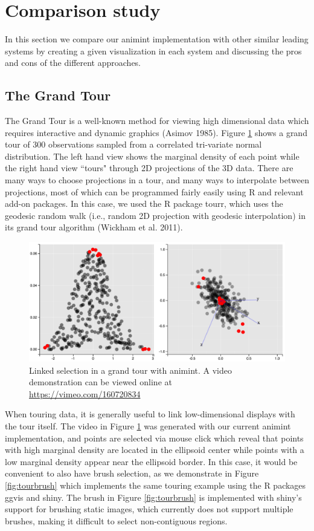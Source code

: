 \documentclass[12pt,]{article}
\theoremstyle{definition}
\theoremstyle{definition}
\theoremstyle{remark}
\begin{document}
\section{Comparison study}\label{compare}

In this section we compare our animint implementation with other similar
leading systems by creating a given visualization in each system and
discussing the pros and cons of the different approaches.

\subsection{The Grand Tour}\label{tour}

The Grand Tour is a well-known method for viewing high dimensional data
which requires interactive and dynamic graphics (Asimov 1985). Figure
\ref{fig:tour} shows a grand tour of 300 observations sampled from a
correlated tri-variate normal distribution. The left hand view shows the
marginal density of each point while the right hand view ``tours"
through 2D projections of the 3D data. There are many ways to choose
projections in a tour, and many ways to interpolate between projections,
most of which can be programmed fairly easily using R and relevant
add-on packages. In this case, we used the R package tourr, which uses
the geodesic random walk (i.e., random 2D projection with geodesic
interpolation) in its grand tour algorithm (Wickham et al. 2011).

\begin{figure}
\centering
\includegraphics{images/tour}
\caption{\label{fig:tour}Linked selection in a grand tour with animint. A
video demonstration can be viewed online at
\url{https://vimeo.com/160720834}}
\end{figure}

When touring data, it is generally useful to link low-dimensional
displays with the tour itself. The video in Figure \ref{fig:tour} was
generated with our current animint implementation, and points are
selected via mouse click which reveal that points with high marginal
density are located in the ellipsoid center while points with a low
marginal density appear near the ellipsoid border. In this case, it
would be convenient to also have brush selection, as we demonstrate in
Figure \ref{fig:tourbrush} which implements the same touring example
using the R packages ggvis and shiny. The brush in Figure
\ref{fig:tourbrush} is implemented with shiny's support for brushing
static images, which currently does not support multiple brushes, making
it difficult to select non-contiguous regions.
\end{document}
